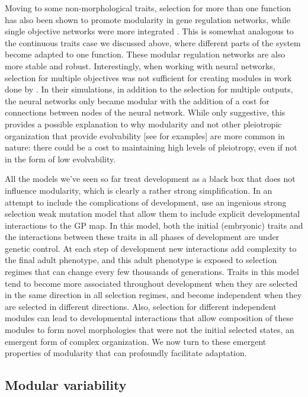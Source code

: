 \begin{refsection}
Moving to some non-morphological traits, selection for more than one
function has also been shown to promote modularity in gene regulation
networks, while single objective networks were more integrated
\parencite{Espinosa-Soto2010-tw}. This is somewhat analogous to the
continuous traits case we discussed above, where different parts of the
system become adapted to one function. These modular regulation networks
are also more stable and robust. Interestingly, when working with neural
networks, selection for multiple objectives was not sufficient for
creating modules in work done by \textcite{Clune2012-ha}. In their simulations, in
addition to the selection for multiple outputs, the neural networks only
became modular with the addition of a cost for connections between nodes
of the neural network. While only suggestive, this provides a possible
explanation to why modularity and not other pleiotropic organization
that provide evolvability {[}see \textcite{Pavlicev2011-xm} for examples{]} are
more common in nature: there could be a cost to maintaining high levels
of pleiotropy, even if not in the form of low evolvability.

All the models we've seen so far treat development as a black box that
does not influence modularity, which is clearly a rather strong
simplification. In an attempt to include the complications of
development, \textcite{Watson2014-pi} use an ingenious strong selection weak
mutation model that allow them to include explicit developmental
interactions to the GP map. In this model, both the initial (embryonic)
traits and the interactions between these traits in all phases of
development are under genetic control. At each step of development new
interactions add complexity to the final adult phenotype, and this adult
phenotype is exposed to selection regimes that can change every few
thousands of generations. Traits in this model tend to become more
associated throughout development when they are selected in the same
direction in all selection regimes, and become independent when they are
selected in different directions. Also, selection for different
independent modules can lead to developmental interactions that allow
composition of these modules to form novel morphologies that were not
the initial selected states, an emergent form of complex organization.
We now turn to these emergent properties of modularity that can
profoundly facilitate adaptation.

\subsection{Modular variability}\label{modular-variability}


\end{refsection}
